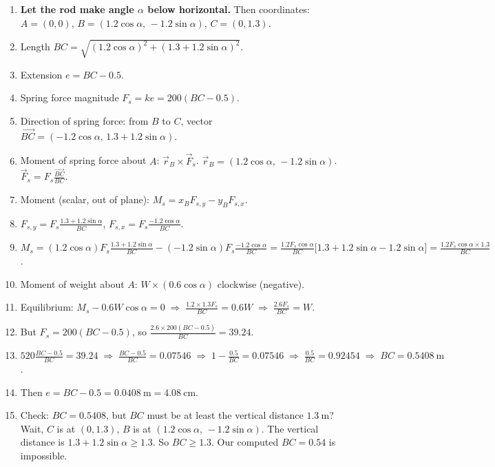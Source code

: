 \documentclass[11pt]{article}
\begin{document}
\begin{exoresolu}
\begin{enumerate}
\item \textbf{Let the rod make angle $\alpha$ below horizontal.} Then coordinates: $A=(0,0)$, $B=(1.2\cos\alpha,\,-1.2\sin\alpha)$, $C=(0,1.3)$.
\item Length $BC = \sqrt{(1.2\cos\alpha)^2 + (1.3+1.2\sin\alpha)^2}$.
\item Extension $e = BC - 0.5$.
\item Spring force magnitude $F_s = k e = 200(BC-0.5)$.
\item Direction of spring force: from $B$ to $C$, vector $\vec{BC} = (-1.2\cos\alpha,\, 1.3+1.2\sin\alpha)$.
\item Moment of spring force about $A$: $\vec{r}_B \times \vec{F}_s$. $\vec{r}_B = (1.2\cos\alpha,\,-1.2\sin\alpha)$. $\vec{F}_s = F_s \frac{\vec{BC}}{BC}$.
\item Moment (scalar, out of plane): $M_s = x_B F_{s,y} - y_B F_{s,x}$.
\item $F_{s,y} = F_s \frac{1.3+1.2\sin\alpha}{BC}$, $F_{s,x} = F_s \frac{-1.2\cos\alpha}{BC}$.
\item $M_s = (1.2\cos\alpha) F_s \frac{1.3+1.2\sin\alpha}{BC} - (-1.2\sin\alpha) F_s \frac{-1.2\cos\alpha}{BC} = \frac{1.2 F_s \cos\alpha}{BC} \big[1.3+1.2\sin\alpha - 1.2\sin\alpha\big] = \frac{1.2 F_s \cos\alpha \times 1.3}{BC}$.
\item Moment of weight about $A$: $W \times (0.6\cos\alpha)$ clockwise (negative).
\item Equilibrium: $M_s - 0.6 W \cos\alpha = 0 \;\Longrightarrow\; \frac{1.2 \times 1.3 F_s}{BC} = 0.6 W \;\Longrightarrow\; \frac{2.6 F_s}{BC} = W$.
\item But $F_s = 200(BC-0.5)$, so $\frac{2.6 \times 200 (BC-0.5)}{BC} = 39.24$.
\item $520 \frac{BC-0.5}{BC} = 39.24 \;\Longrightarrow\; \frac{BC-0.5}{BC} = 0.07546 \;\Longrightarrow\; 1 - \frac{0.5}{BC} = 0.07546 \;\Longrightarrow\; \frac{0.5}{BC} = 0.92454 \;\Longrightarrow\; BC = 0.5408\ \mathrm{m}$.
\item Then $e = BC - 0.5 = 0.0408\ \mathrm{m} = 4.08\ \mathrm{cm}$.
\item Check: $BC=0.5408$, but $BC$ must be at least the vertical distance $1.3\ \mathrm{m}$? Wait, $C$ is at $(0,1.3)$, $B$ is at $(1.2\cos\alpha,\,-1.2\sin\alpha)$. The vertical distance is $1.3+1.2\sin\alpha \ge 1.3$. So $BC \ge 1.3$. Our computed $BC=0.54$ is impossible.

\end{enumerate}
\end{exoresolu}
\end{document}
